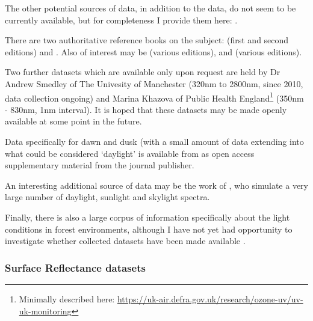 The other potential sources of data, in addition to the \citet{judd_spectral_1964} data, do not seem to be currently available, but for completeness I provide them here: \citet{condit_spectral_1964, tarrant_spectral_1968, dicarlo_illuminant_2000, taylor_distribution_1941, henderson_spectral_1964, sastri_typical_1968, dixon_spectral_1978, sastri_spectral_1966,williams_statistical_2009,bui_group_2004}.

There are two authoritative reference books on the subject: \citet{henderson_daylight_1970,henderson_daylight_1977} (first and second editions) and \cite{robinson_solar_1966}. Also of interest may be \citet{minnaert_light_1993} (various editions), and \citet{lynch_color_2001} (various editions).

Two further datasets which are available only upon request are held by Dr Andrew Smedley of The Univesity of Manchester (320nm to 2800nm, since 2010, data collection ongoing) and Marina Khazova of Public Health England\footnote{Minimally described here: \url{https://uk-air.defra.gov.uk/research/ozone-uv/uv-uk-monitoring}} (350nm - 830nm, 1nm interval). It is hoped that these datasets may be made openly available at some point in the future.

Data specifically for dawn and dusk (with a small amount of data extending into what could be considered `daylight' is available from \citet{spitschan_variation_2016} as open access supplementary material from the journal publisher. 

An interesting additional source of data may be the work of \citet{peyvandi_colorimetric_2016}, who simulate a very large number of daylight, sunlight and skylight spectra. 

Finally, there is also a large corpus of information specifically about the light conditions in forest environments, although I have not yet had opportunity to investigate whether collected datasets have been made available \citep{sumner_catarrhine_2000,chiao_characterization_2000,federer_spectral_1966,geiger_climate_2003,thery_forest_2001,xu_changes_2013,wang_real-time_2006,endler_color_1993,brinkmann_light_1971,de_castro_light_2000,freyman_spectral_1968,fassnacht_review_2016,blackburn_seasonal_1995}.


\subsubsection{Surface Reflectance datasets}


